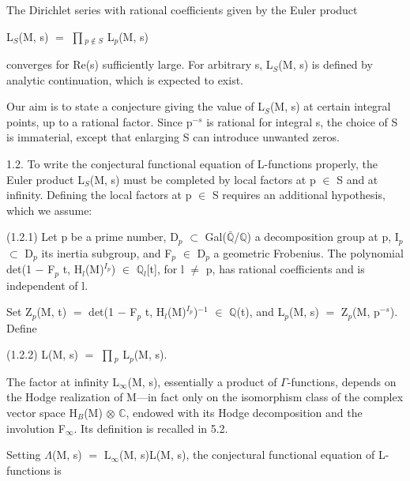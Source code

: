 \documentclass[10pt,twoside]{article}
\begin{document}
The Dirichlet series with rational coefficients given by the Euler product\par
L\ensuremath{_{S}}(M, s) \ensuremath{=} \ensuremath{∏}\ensuremath{_{p∉S}} L\ensuremath{_{p}}(M, s)\par
converges for Re(s) sufficiently large. For arbitrary s, L\ensuremath{_{S}}(M, s) is defined by analytic continuation, which is expected to exist.\par
Our aim is to state a conjecture giving the value of L\ensuremath{_{S}}(M, s) at certain integral points, up to a rational factor. Since p\ensuremath{^{−s}} is rational for integral s, the choice of S is immaterial, except that enlarging S can introduce unwanted zeros.\par
1.2. To write the conjectural functional equation of L-functions properly, the Euler product L\ensuremath{_{S}}(M, s) must be completed by local factors at p \ensuremath{∈} S and at infinity. Defining the local factors at p \ensuremath{∈} S requires an additional hypothesis, which we assume:\par
(1.2.1) Let p be a prime number, D\ensuremath{_{p}} \ensuremath{⊂} Gal(\ensuremath{\bar{ℚ}}/\ensuremath{ℚ}) a decomposition group at p, I\ensuremath{_{p}} \ensuremath{⊂} D\ensuremath{_{p}} its inertia subgroup, and F\ensuremath{_{p}} \ensuremath{∈} D\ensuremath{_{p}} a geometric Frobenius. The polynomial det(1 \ensuremath{−} F\ensuremath{_{p}} t, H\ensuremath{_{l}}(M)\ensuremath{^{I_p}}) \ensuremath{∈} \ensuremath{ℚ}\ensuremath{_{l}}[t], for l \ensuremath{≠} p, has rational coefficients and is independent of l.\par
Set Z\ensuremath{_{p}}(M, t) \ensuremath{=} det(1 \ensuremath{−} F\ensuremath{_{p}} t, H\ensuremath{_{l}}(M)\ensuremath{^{I_p}})\ensuremath{^{−1}} \ensuremath{∈} \ensuremath{ℚ}(t), and L\ensuremath{_{p}}(M, s) \ensuremath{=} Z\ensuremath{_{p}}(M, p\ensuremath{^{−s}}). Define\par
(1.2.2)    L(M, s) \ensuremath{=} \ensuremath{∏}\ensuremath{_{p}} L\ensuremath{_{p}}(M, s).\par
The factor at infinity L\ensuremath{_{∞}}(M, s), essentially a product of \ensuremath{Γ}-functions, depends on the Hodge realization of M—in fact only on the isomorphism class of the complex vector space H\ensuremath{_{B}}(M) \ensuremath{⊗} \ensuremath{ℂ}, endowed with its Hodge decomposition and the involution F\ensuremath{_{∞}}. Its definition is recalled in 5.2.\par
Setting \ensuremath{Λ}(M, s) \ensuremath{=} L\ensuremath{_{∞}}(M, s)L(M, s), the conjectural functional equation of L-functions is\par
\end{document}
